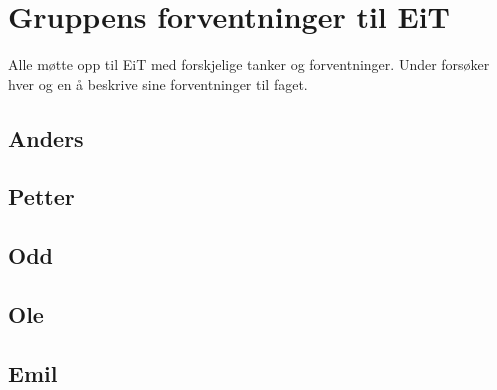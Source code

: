 \section{Gruppens forventninger til EiT}
Alle møtte opp til EiT med forskjelige tanker og forventninger. 
Under forsøker hver og en å beskrive sine forventninger til faget. 

\subsection{Anders}

\vspace{\secspace}

\subsection{Petter}

\vspace{\secspace}

\subsection{Odd}

\vspace{\secspace}

\subsection{Ole}

\vspace{\secspace}

\subsection{Emil}

\vspace{\secspace}

